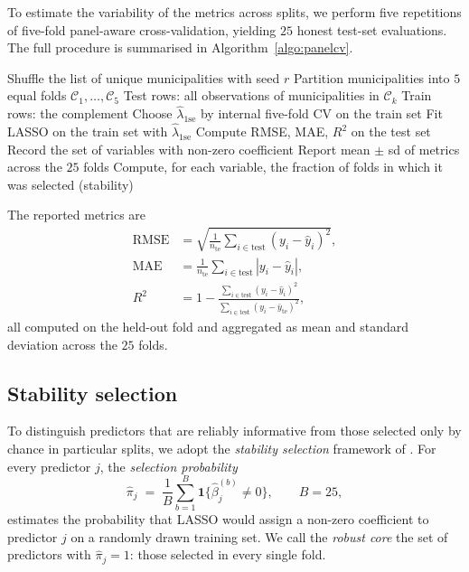 \documentclass[11pt,a4paper]{article}
\begin{document}
To estimate the variability of the metrics across splits, we perform
five repetitions of five-fold panel-aware cross-validation, yielding
\(25\) honest test-set evaluations. The full procedure is summarised
in Algorithm~\ref{algo:panelcv}.

\begin{algorithm}[h!]
  \caption{Repeated panel-aware cross-validation for LASSO}
  \label{algo:panelcv}
  \begin{algorithmic}[1]
      \State Shuffle the list of unique municipalities with seed \(r\)
      \State Partition municipalities into \(5\) equal folds
        \(\mathcal{C}_1, \ldots, \mathcal{C}_5\)
        \State Test rows: all observations of municipalities in
          \(\mathcal{C}_k\)
        \State Train rows: the complement
        \State Choose \(\hat{\lambda}_{\mathrm{1se}}\) by internal
          five-fold CV on the train set
        \State Fit LASSO on the train set with \(\hat{\lambda}_{\mathrm{1se}}\)
        \State Compute RMSE, MAE, \(R^{2}\) on the test set
        \State Record the set of variables with non-zero coefficient
      \EndFor
    \EndFor
    \State Report mean \(\pm\) sd of metrics across the \(25\) folds
    \State Compute, for each variable, the fraction of folds in which
      it was selected (stability)
  \end{algorithmic}
\end{algorithm}

The reported metrics are
\begin{align}
  \mathrm{RMSE} &= \sqrt{\tfrac{1}{n_{\text{te}}}
                 \textstyle\sum_{i \in \text{test}}(y_i - \hat{y}_i)^2}, \\
  \mathrm{MAE}  &= \tfrac{1}{n_{\text{te}}}
                 \textstyle\sum_{i \in \text{test}} |y_i - \hat{y}_i|, \\
  R^{2}         &= 1 - \frac{\sum_{i \in \text{test}}(y_i - \hat{y}_i)^2}
                       {\sum_{i \in \text{test}}(y_i - \bar{y}_{\text{te}})^2},
\end{align}
all computed on the held-out fold and aggregated as mean and standard
deviation across the \(25\) folds.

\subsection{Stability selection}
\label{sec:stability}

To distinguish predictors that are reliably informative from those
selected only by chance in particular splits, we adopt the
\emph{stability selection} framework of
\citet{meinshausenbuhlmann2010}. For every predictor \(j\), the
\emph{selection probability}
\begin{equation}
  \hat{\pi}_{j}
  \;=\;
  \frac{1}{B} \sum_{b=1}^{B}
  \mathbf{1}\!\bigl\{\hat{\beta}_{j}^{(b)} \neq 0\bigr\},
  \qquad B = 25,
  \label{eq:stab}
\end{equation}
estimates the probability that LASSO would assign a non-zero
coefficient to predictor \(j\) on a randomly drawn training set. We
call the \emph{robust core} the set of predictors with
\(\hat{\pi}_{j} = 1\): those selected in every single fold.
\end{document}
